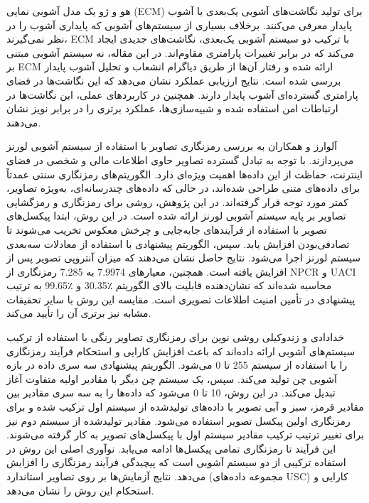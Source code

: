 هو و ژو \cite{ref4} یک مدل آشوبی نمایی (‎ECM‎) برای تولید نگاشت‌های آشوبی یک‌بعدی با آشوب پایدار معرفی می‌کنند. برخلاف بسیاری از سیستم‌های آشوبی که پایداری آشوب را در نظر نمی‌گیرند، ‎ECM‎ با ترکیب دو سیستم آشوبی یک‌بعدی، نگاشت‌های جدیدی ایجاد می‌کند که در برابر تغییرات پارامتری مقاوم‌اند. در این مقاله، نه سیستم آشوبی مبتنی بر ‎ECM‎ ارائه شده و رفتار آن‌ها از طریق دیاگرام انشعاب و تحلیل آشوب پایدار بررسی شده است. نتایج ارزیابی عملکرد نشان می‌دهد که این نگاشت‌ها در فضای پارامتری گسترده‌ای آشوب پایدار دارند. همچنین در کاربردهای عملی، این نگاشت‌ها در ارتباطات امن استفاده شده و شبیه‌سازی‌ها، عملکرد برتری را در برابر نویز نشان می‌دهند.

آلوارز و همکاران \cite{ref6} به بررسی رمزنگاری تصاویر با استفاده از سیستم آشوبی لورنز می‌پردازند. با توجه به تبادل گسترده تصاویر حاوی اطلاعات مالی و شخصی در فضای اینترنت، حفاظت از این داده‌ها اهمیت ویژه‌ای دارد. الگوریتم‌های رمزنگاری سنتی عمدتاً برای داده‌های متنی طراحی شده‌اند، در حالی که داده‌های چندرسانه‌ای، به‌ویژه تصاویر، کمتر مورد توجه قرار گرفته‌اند. در این پژوهش، روشی برای رمزنگاری و رمزگشایی تصاویر بر پایه سیستم آشوبی لورنز ارائه شده است. در این روش، ابتدا پیکسل‌های تصویر با استفاده از فرآیندهای جابه‌جایی و چرخش معکوس تخریب می‌شوند تا تصادفی‌بودن افزایش یابد. سپس، الگوریتم پیشنهادی با استفاده از معادلات سه‌بعدی سیستم لورنز اجرا می‌شود. نتایج حاصل نشان می‌دهند که میزان آنتروپی تصویر پس از رمزنگاری از ‎7.285‎ به ‎7.9974‎ افزایش یافته است. همچنین، معیارهای ‎NPCR‎ و ‎UACI‎ به ترتیب ‎99.65٪‎ و ‎30.35٪‎ محاسبه شده‌اند که نشان‌دهنده قابلیت بالای الگوریتم پیشنهادی در تأمین امنیت اطلاعات تصویری است. مقایسه این روش با سایر تحقیقات مشابه نیز برتری آن را تأیید می‌کند.

خدادادی و زندوکیلی \cite{ref7} روشی نوین برای رمزنگاری تصاویر رنگی با استفاده از ترکیب سیستم‌های آشوبی ارائه داده‌اند که باعث افزایش کارایی و استحکام فرآیند رمزنگاری می‌شود. الگوریتم پیشنهادی سه سری داده در بازه ‎0‎ تا ‎255‎ را با استفاده از سیستم آشوبی چن تولید می‌کند. سپس، یک سیستم چن دیگر با مقادیر اولیه متفاوت آغاز می‌شود که داده‌ها را به سه سری مقادیر بین ‎0‎ تا ‎10‎ تبدیل می‌کند. در این روش، مقادیر قرمز، سبز و آبی تصویر با داده‌های تولیدشده از سیستم اول ترکیب شده و برای رمزنگاری اولین پیکسل تصویر استفاده می‌شود. مقادیر تولیدشده از سیستم دوم نیز برای تغییر ترتیب ترکیب مقادیر سیستم اول با پیکسل‌های تصویر به کار گرفته می‌شوند. این فرآیند تا رمزنگاری تمامی پیکسل‌ها ادامه می‌یابد. نوآوری اصلی این روش در استفاده ترکیبی از دو سیستم آشوبی است که پیچیدگی فرآیند رمزنگاری را افزایش می‌دهد. نتایج آزمایش‌ها بر روی تصاویر استاندارد (مجموعه داده‌های ‎USC‎) کارایی و استحکام این روش را نشان می‌دهد.

